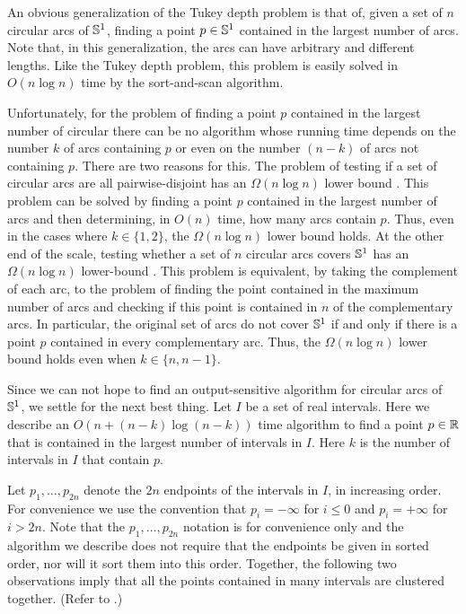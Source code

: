 \documentclass[charterfonts,lotsofwhite]{patmorin}
\begin{document}
An obvious generalization of the Tukey depth problem is that of, given
a set of $n$ circular arcs of $\mathbb{S}^1$, finding a point $p\in\mathbb{S}^1$
contained in the largest number of arcs.  Note that, in this
generalization, the arcs can have arbitrary and different lengths.
Like the Tukey depth problem, this problem is easily solved in
$O(n\log n)$ time by the sort-and-scan algorithm.  

Unfortunately, for the problem of finding a point $p$ contained in the
largest number of circular there can be no algorithm whose running
time depends on the number $k$ of arcs containing $p$ or even on the
number $(n-k)$ of arcs not containing $p$. There are two reasons for
this.  The problem of testing if a set of circular arcs are all
pairwise-disjoint has an $\Omega(n\log n)$ lower bound \cite{b-o83}.
This problem can be solved by finding a point $p$ contained in the
largest number of arcs and then determining, in $O(n)$ time, how many
arcs contain $p$.  Thus, even in the cases where $k\in\{1, 2\}$, the
$\Omega(n\log n)$ lower bound holds.  At the other end of the scale,
testing whether a set of $n$ circular arcs covers $\mathbb{S}^1$ has an
$\Omega(n\log n)$ lower-bound \cite{b-o83}.  This problem is
equivalent, by taking the complement of each arc, to the problem of
finding the point contained in the maximum number of arcs and checking
if this point is contained in $n$ of the complementary arcs.  In
particular, the original set of arcs do not cover $\mathbb{S}^1$ if and only
if there is a point $p$ contained in every complementary arc.  Thus,
the $\Omega(n\log n)$ lower bound holds even when $k\in\{n,n-1\}$.

Since we can not hope to find an output-sensitive algorithm for
circular arcs of $\mathbb{S}^1$, we settle for the next best thing.  Let $I$
be a set of real intervals.  Here we describe an $O(n+(n-k)\log
(n-k))$ time algorithm to find a point $p\in\mathbb{R}$ that is contained in
the largest number of intervals in $I$.  Here $k$ is the number of
intervals in $I$ that contain $p$.  

Let $p_1,\ldots,p_{2n}$ denote the $2n$ endpoints of the intervals in
$I$, in increasing order. For convenience we use the convention that
$p_i = -\infty$ for $i\le 0$ and $p_i=+\infty$ for $i > 2n$.  Note
that the $p_1,\ldots,p_{2n}$ notation is for convenience only and the
algorithm we describe does not require that the endpoints be given in
sorted order, nor will it sort them into this order. Together, the
following two observations imply that all the points contained in many
intervals are clustered together. (Refer to .)
\end{document}
